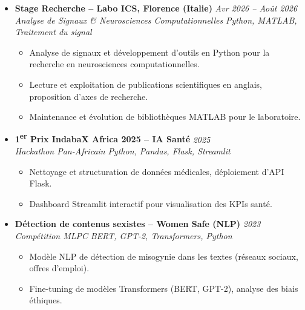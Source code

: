 \documentclass[a4paper,11pt]{article}
\begin{document}
\begin{itemize}[leftmargin=*, label={-}]
\item \textbf{Stage Recherche -- Labo ICS, Florence (Italie)} \hfill \textit{Avr 2026 -- Août 2026} \\
\textit{Analyse de Signaux \& Neurosciences Computationnelles} \hfill \textit{Python, MATLAB, Traitement du signal}
\vspace{-2pt}
    \begin{itemize}[leftmargin=0.4cm, nosep, label=\tiny$\bullet$]
        \item \small{Analyse de signaux et développement d'outils en Python pour la recherche en neurosciences computationnelles.}
        \item \small{Lecture et exploitation de publications scientifiques en anglais, proposition d'axes de recherche.}
        \item \small{Maintenance et évolution de bibliothèques MATLAB pour le laboratoire.}
    \end{itemize}
\vspace{3pt}

\item \textbf{1\textsuperscript{er} Prix IndabaX Africa 2025 -- IA Santé} \hfill \textit{2025} \\
\textit{Hackathon Pan-Africain} \hfill \textit{Python, Pandas, Flask, Streamlit}
\vspace{-2pt}
    \begin{itemize}[leftmargin=0.4cm, nosep, label=\tiny$\bullet$]
        \item \small{Nettoyage et structuration de données médicales, déploiement d'API Flask.}
        \item \small{Dashboard Streamlit interactif pour visualisation des KPIs santé.}
    \end{itemize}
\vspace{3pt}

\item \textbf{Détection de contenus sexistes -- Women Safe (NLP)} \hfill \textit{2023} \\
\textit{Compétition MLPC} \hfill \textit{BERT, GPT-2, Transformers, Python}
\vspace{-2pt}
    \begin{itemize}[leftmargin=0.4cm, nosep, label=\tiny$\bullet$]
        \item \small{Modèle NLP de détection de misogynie dans les textes (réseaux sociaux, offres d'emploi).}
        \item \small{Fine-tuning de modèles Transformers (BERT, GPT-2), analyse des biais éthiques.}
    \end{itemize}
\vspace{3pt}

\end{itemize}
\end{document}
